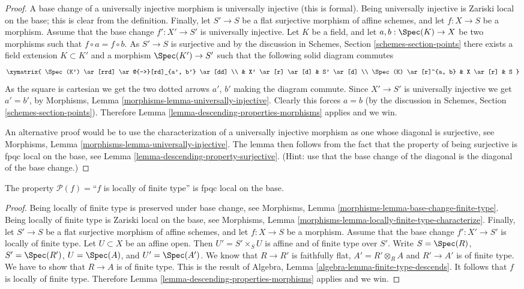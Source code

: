 \begin{proof}
A base change of a universally injective morphism is universally
injective (this is formal). Being universally injective is Zariski
local on the base; this is clear from the definition.
Finally, let
$S' \to S$ be a flat surjective morphism of affine schemes,
and let $f : X \to S$ be a morphism. Assume that the base change
$f' : X' \to S'$ is universally injective. Let $K$ be a field, and let
$a, b : \Spec(K) \to X$ be two morphisms such that
$f \circ a = f \circ b$. As $S' \to S$ is surjective and
by the discussion in Schemes,
Section \ref{schemes-section-points} there exists a field
extension $K \subset K'$ and a morphism $\Spec(K')
\to S'$ such that the following solid diagram commutes
$$
\xymatrix{
\Spec(K') \ar[rrd] \ar@{-->}[rd]_{a', b'} \ar[dd] \\
 &
X' \ar[r] \ar[d] &
S' \ar[d] \\
\Spec(K) \ar[r]^{a, b} &
X \ar[r] &
S
}
$$
As the square is cartesian we get the two dotted arrows $a'$, $b'$ making the
diagram commute. Since $X' \to S'$ is universally injective we get $a' = b'$,
by
Morphisms, Lemma \ref{morphisms-lemma-universally-injective}.
Clearly this forces $a = b$ (by the discussion in Schemes,
Section \ref{schemes-section-points}).
Therefore Lemma \ref{lemma-descending-properties-morphisms} applies and we win.

\medskip\noindent
An alternative proof would be to use the characterization of a universally
injective morphism as one whose diagonal is surjective, see
Morphisms, Lemma \ref{morphisms-lemma-universally-injective}.
The lemma then follows from the fact that
the property of being surjective is fpqc local on the base, see
Lemma \ref{lemma-descending-property-surjective}.
(Hint: use that the base change of the diagonal is the diagonal
of the base change.)
\end{proof}

\begin{lemma}
\label{lemma-descending-property-locally-finite-type}
The property $\mathcal{P}(f) =$``$f$ is locally of finite type''
is fpqc local on the base.
\end{lemma}

\begin{proof}
Being locally of finite type is preserved under base change, see
Morphisms, Lemma \ref{morphisms-lemma-base-change-finite-type}.
Being locally of finite type is Zariski local on the base, see
Morphisms, Lemma \ref{morphisms-lemma-locally-finite-type-characterize}.
Finally, let
$S' \to S$ be a flat surjective morphism of affine schemes,
and let $f : X \to S$ be a morphism. Assume that the base change
$f' : X' \to S'$ is locally of finite type.
Let $U \subset X$ be an affine open. Then $U' = S' \times_S U$
is affine and of finite type over $S'$. Write
$S = \Spec(R)$,
$S' = \Spec(R')$,
$U = \Spec(A)$, and
$U' = \Spec(A')$.
We know that $R \to R'$ is faithfully flat,
$A' = R' \otimes_R A$ and $R' \to A'$ is of finite type.
We have to show that $R \to A$ is of finite type.
This is the result of
Algebra, Lemma \ref{algebra-lemma-finite-type-descends}.
It follows that $f$ is locally of finite type.
Therefore Lemma \ref{lemma-descending-properties-morphisms} applies and we win.
\end{proof}

